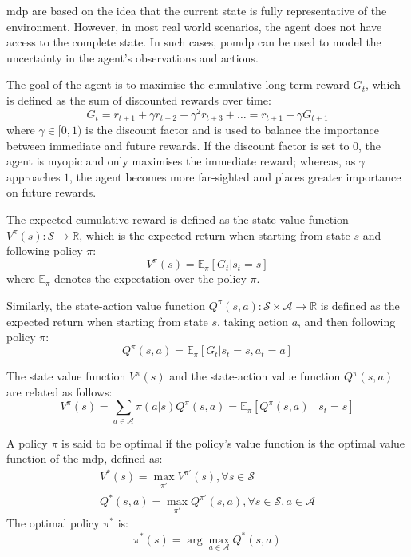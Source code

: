 \acrlong{mdp} are based on the idea that the current state is fully representative of the environment. However, in most real world scenarios, the agent does not have access to the complete state. In such cases, \acrfull{pomdp} can be used to model the uncertainty in the agent's observations and actions.

The goal of the agent is to maximise the cumulative long-term reward $G_t$, which is defined as the sum of discounted rewards over time:
\begin{equation}
    G_t = r_{t+1} + \gamma r_{t+2} + \gamma^2 r_{t+3} + \dots = r_{t+1} + \gamma G_{t+1}
\end{equation}
where $\gamma \in [0, 1)$ is the discount factor and is used to balance the importance between immediate and future rewards. If the discount factor is set to 0, the agent is myopic and only maximises the immediate reward; whereas, as $\gamma$ approaches $1$, the agent becomes more far-sighted and places greater importance on future rewards.

The expected cumulative reward is defined as the state value function $V^\pi(s): \mathcal{S} \to \mathbb{R}$, which is the expected return when starting from state $s$ and following policy $\pi$:
\begin{equation}
    V^\pi(s) = \mathbb{E}_\pi \left[G_t | s_t = s\right] 
\end{equation}
where $\mathbb{E}_\pi$ denotes the expectation over the policy $\pi$.

Similarly, the state-action value function $Q^\pi(s, a): \mathcal{S} \times \mathcal{A} \to \mathbb{R}$ is defined as the expected return when starting from state $s$, taking action $a$, and then following policy $\pi$:
\begin{equation}
    Q^\pi(s, a) = \mathbb{E}_\pi \left[G_t | s_t = s, a_t = a\right] 
\end{equation}

The state value function $V^\pi(s)$ and the state-action value function $Q^\pi(s, a)$ are related as follows:
\begin{equation}
    V^\pi(s) = \sum_{a \in \mathcal{A}} \pi(a | s) Q^\pi(s, a) = \mathbb{E}_\pi \left[Q^\pi(s, a) \mid s_t = s\right]
\end{equation}

A policy $\pi$ is said to be optimal if the policy's value function is the optimal value function of the \acrshort{mdp}, defined as: 
\begin{eqnarray}
    V^*(s) = \max_{\pi'} V^{\pi'}(s), \forall s \in \mathcal{S} \\ 
    Q^*(s, a) = \max_{\pi'} Q^{\pi'}(s, a), \forall s \in \mathcal{S}, a \in \mathcal{A}
\end{eqnarray}
The optimal policy $\pi^*$ is:
\begin{equation}
    \pi^*(s) = \arg \max_{a\in \mathcal{A}} Q^*(s, a)
\end{equation}

